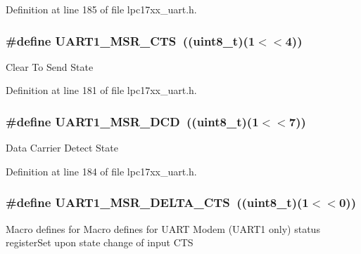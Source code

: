 Definition at line 185 of file lpc17xx\+\_\+uart.\+h.

\subsubsection[{\texorpdfstring{U\+A\+R\+T1\+\_\+\+M\+S\+R\+\_\+\+C\+TS}{UART1_MSR_CTS}}]{\setlength{\rightskip}{0pt plus 5cm}\#define U\+A\+R\+T1\+\_\+\+M\+S\+R\+\_\+\+C\+TS~(({\bf uint8\+\_\+t})(1$<$$<$4))}\hypertarget{group___u_a_r_t___private___macros_gae33cbb3bfc95dfa93e011c08057aa58c}{}\label{group___u_a_r_t___private___macros_gae33cbb3bfc95dfa93e011c08057aa58c}
Clear To Send State 

Definition at line 181 of file lpc17xx\+\_\+uart.\+h.

\subsubsection[{\texorpdfstring{U\+A\+R\+T1\+\_\+\+M\+S\+R\+\_\+\+D\+CD}{UART1_MSR_DCD}}]{\setlength{\rightskip}{0pt plus 5cm}\#define U\+A\+R\+T1\+\_\+\+M\+S\+R\+\_\+\+D\+CD~(({\bf uint8\+\_\+t})(1$<$$<$7))}\hypertarget{group___u_a_r_t___private___macros_gad420620d318c71094a74ba44b1ce3483}{}\label{group___u_a_r_t___private___macros_gad420620d318c71094a74ba44b1ce3483}
Data Carrier Detect State 

Definition at line 184 of file lpc17xx\+\_\+uart.\+h.

\subsubsection[{\texorpdfstring{U\+A\+R\+T1\+\_\+\+M\+S\+R\+\_\+\+D\+E\+L\+T\+A\+\_\+\+C\+TS}{UART1_MSR_DELTA_CTS}}]{\setlength{\rightskip}{0pt plus 5cm}\#define U\+A\+R\+T1\+\_\+\+M\+S\+R\+\_\+\+D\+E\+L\+T\+A\+\_\+\+C\+TS~(({\bf uint8\+\_\+t})(1$<$$<$0))}\hypertarget{group___u_a_r_t___private___macros_ga2bb22876f02e34aa21bcd162cea55efb}{}\label{group___u_a_r_t___private___macros_ga2bb22876f02e34aa21bcd162cea55efb}
Macro defines for Macro defines for U\+A\+RT Modem (U\+A\+R\+T1 only) status register\+Set upon state change of input C\+TS 

